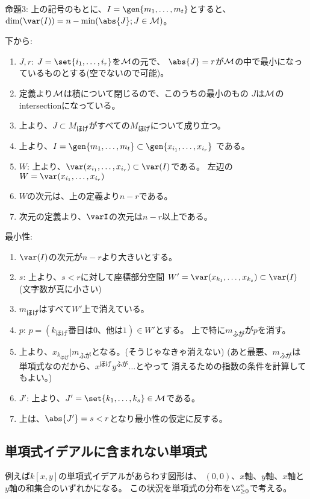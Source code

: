 \begin{framed}
  命題3:
  上の記号のもとに、$I=\gen{m_1,\dots,m_t}$とすると、
  $\dim(\var(I)) = n - \min(\abs{J}; J\in \cal M)$。
\end{framed}
\begin{myproof}
  下から:
  \begin{enumerate}
    \item $J,r$:
    $J=\set{i_1,\dots,i_r}$を$\cal M$の元で、
    $\abs{J} = r$が$\cal M$の中で最小になっているものとする(空でないので可能)。
    \item
    定義より$\cal M$は積について閉じるので、このうちの最小のもの
    $J$は$\cal M$のintersectionになっている。
    \item
    上より、$J \subset M_{ほげ}$がすべての$M_{ほげ}$について成り立つ。
    \item
    上より、$I = \gen{m_1,\dots,m_t} \subset \gen{x_{i_1},\dots,x_{i_r}}$
    である。
    \item $W$:
    上より、$\var(x_{i_1},\dots,x_{i_r}) \subset \var(I)$である。
    左辺の$W=\var(x_{i_1},\dots,x_{i_r})$
    \item
    $W$の次元は、上の定義より$n-r$である。
    \item
    次元の定義より、$\varI$の次元は$n-r$以上である。
  \end{enumerate}
  最小性:
  \begin{enumerate}
    \item $\var(I)$の次元が$n-r$より大きいとする。
    \item $s$:
     上より、$s<r$に対して座標部分空間
     $W'=\var(x_{k_1},\dots,x_{k_s}) \subset \var(I)$
     (文字数が真に小さい)
    \item $m_{ほげ}$はすべて$W'$上で消えている。
    \item $p$: $p = (k_{ほげ}番目は0、他は1)\in W'$とする。
    上で特に$m_{ふが}$が$p$を消す。
    \item
    上より、$x_{k_{ほげ}} | m_{ふが}$となる。(そうじゃなきゃ消えない)
    (あと最悪、$m_{ふが}$は単項式なのだから、$x^{ほげ}y^{ふが}\dots$とやって
    消えるための指数の条件を計算してもよい。)
    \item $J'$:
    上より、$J'=\set{k_1,\dots,k_s} \in \cal M$である。
    \item
    上は、$\abs{J'} = s < r$となり最小性の仮定に反する。
  \end{enumerate}
\end{myproof}

\subsection{単項式イデアルに含まれない単項式}
\label{sub:単項式イデアルに含まれない単項式}
例えば$k[x,y]$の単項式イデアルがあらわす図形は、
$(0,0)$、$x$軸、$y$軸、$x$軸と$y$軸の和集合のいずれかになる。
この状況を単項式の分布を$\Z_{\ge 0}^n$で考える。

